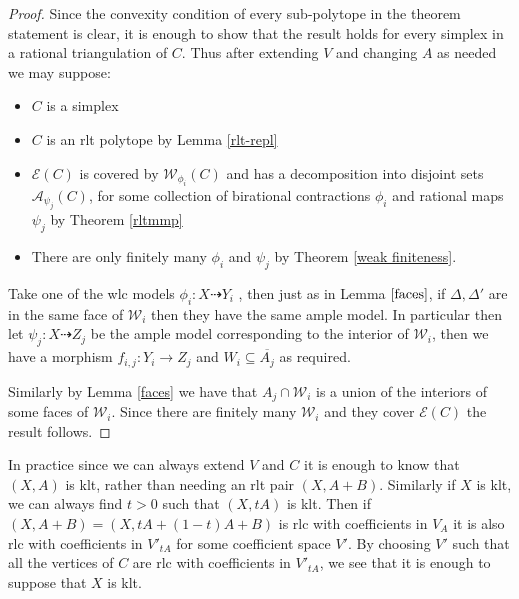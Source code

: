 \documentclass[a4paper,12pt]{amsart}
\begin{document}
	\begin{proof}
		
		Since the convexity condition of every sub-polytope in the theorem statement is clear, it is enough to show that the result holds for every simplex in a rational triangulation of $C$. Thus after extending $V$ and changing $A$ as needed we may suppose:
		
		\begin{itemize}
			\item $C$ is a simplex 
			\item $C$ is an rlt polytope by Lemma \ref{rlt-repl}
			\item $\mathcal{E}(C)$ is covered by $\mathcal{W}_{\phi_{i}}(C)$  and has a decomposition into disjoint sets $\mathcal{A}_{\psi_{j}}(C)$,
			for some collection of birational contractions $\phi_{i}$ and rational maps $\psi_{j}$ by Theorem \ref{rltmmp} 
			\item There are only finitely many $\phi_{i}$ and $\psi_{j}$ by Theorem \ref{weak finiteness}.
		\end{itemize}
			
		Take one of the wlc models $\phi_{i}:X \dashrightarrow Y_{i}$ , then just as in Lemma $\ref{faces}$, if $\Delta,\Delta'$ are in the same face of $\mathcal{W}_{i}$ then they have the same ample model. In particular then let $\psi_{j}:X \dashrightarrow Z_{j}$ be the ample model corresponding to the interior of $\mathcal{W}_{i}$, then we have a morphism $f_{i,j}: Y_{i} \to Z_{j}$ and  $W_{i} \subseteq \overline{A_{j}}$ as required. 
		
		Similarly by Lemma \ref{faces} we have that $A_{j} \cap \mathcal{W}_{i}$ is a union of the interiors of some faces of $\mathcal{W}_{i}$. Since there are finitely many $\mathcal{W}_{i}$ and they cover $\mathcal{E}(C)$ the result follows.
	\end{proof}

	\begin{remark}
		In practice since we can always extend $V$ and $C$ it is enough to know that $(X,A)$ is klt, rather than needing an rlt pair $(X,A+B)$. Similarly if $X$ is klt, we can always find $t>0$ such that $(X,tA)$ is klt. Then if $(X,A+B)=(X,tA+(1-t)A+B)$ is rlc with coefficients in $V_{A}$ it is also rlc with coefficients in $V'_{tA}$ for some coefficient space $V'$. By choosing $V'$ such that all the vertices of $C$ are rlc with coefficients in $V'_{tA}$, we see that it is enough to suppose that $X$ is klt.
	\end{remark}
\end{document}
